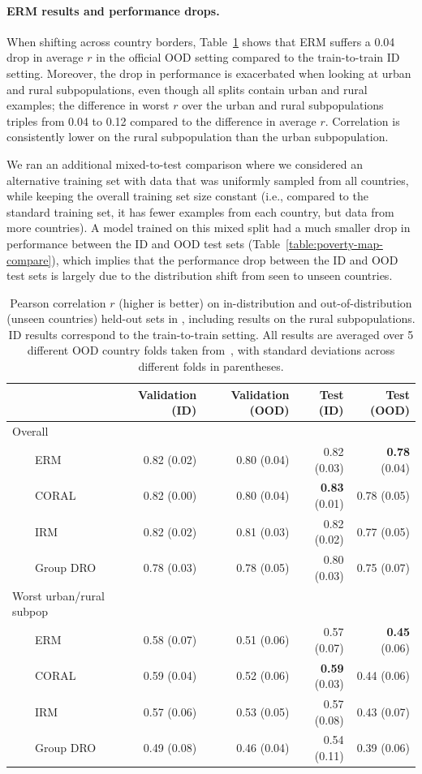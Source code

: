 \paragraph{ERM results and performance drops.}
When shifting across country borders, Table~\ref{table:poverty-map} shows that ERM suffers a 0.04 drop in average $r$ in the official OOD setting compared to the train-to-train ID setting.
Moreover, the drop in performance is exacerbated when looking at urban and rural subpopulations, even though all splits contain urban and rural examples;
the difference in worst $r$ over the urban and rural subpopulations triples from 0.04 to 0.12 compared to the difference in average $r$.
Correlation is consistently lower on the rural subpopulation than the urban subpopulation.

We ran an additional mixed-to-test comparison where we considered an alternative training set with data that was uniformly sampled from all countries, while keeping the overall training set size constant (i.e., compared to the standard training set, it has fewer examples from each country, but data from more countries).
A model trained on this mixed split had a much smaller drop in performance between the ID and OOD test sets (Table~\ref{table:poverty-map-compare}), which implies that the performance drop between the ID and OOD test sets is largely due to the distribution shift from seen to unseen countries.

\begin{table}[tbp]
\caption{Pearson correlation $r$ (higher is better) on in-distribution and out-of-distribution (unseen countries) held-out sets in \PovertyMap, including results on the rural subpopulations.
ID results correspond to the train-to-train setting.
All results are averaged over 5 different OOD country folds taken from~\citet{yeh2020poverty}, with standard deviations across different folds in parentheses.}
  \centering
\begin{tabular} {l r r r r}
\toprule
 & Validation (ID) & Validation (OOD) & Test (ID) & Test (OOD)\\
\midrule
Overall & & & &\\
~~~~ERM & 0.82 (0.02) & 0.80 (0.04) & 0.82 (0.03) & \textbf{0.78} (0.04)\\
~~~~CORAL & 0.82 (0.00) & 0.80 (0.04) & \textbf{0.83} (0.01) & 0.78 (0.05)\\
~~~~IRM & 0.82 (0.02) & 0.81 (0.03) & 0.82 (0.02) & 0.77 (0.05)\\
~~~~Group DRO  & 0.78 (0.03) & 0.78 (0.05) & 0.80 (0.03) & 0.75 (0.07) \\
Worst urban/rural subpop & & & &\\
~~~~ERM & 0.58 (0.07) & 0.51 (0.06) & 0.57 (0.07) & \textbf{0.45} (0.06)\\
~~~~CORAL & 0.59 (0.04) & 0.52 (0.06) & \textbf{0.59} (0.03) & 0.44 (0.06) \\
~~~~IRM & 0.57 (0.06) & 0.53 (0.05) & 0.57 (0.08) & 0.43 (0.07)\\
~~~~Group DRO  & 0.49 (0.08) & 0.46 (0.04) & 0.54 (0.11) & 0.39 (0.06) \\
\bottomrule
\end{tabular}
\label{table:poverty-map}
\end{table}

